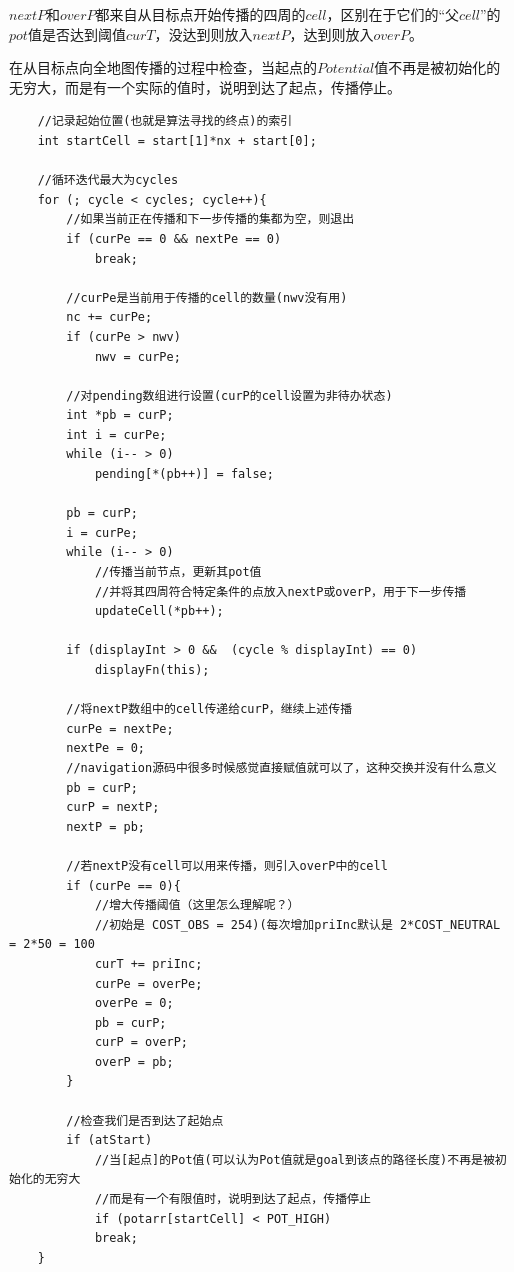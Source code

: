 \documentclass[9pt, oneside]{book}
\begin{document}
$nextP$和$overP$都来自从目标点开始传播的四周的$cell$，区别在于它们的“父$cell$”的$pot$值是否达到阈值$curT$，没达到则放入$nextP$，达到则放入$overP$。

在从目标点向全地图传播的过程中检查，当起点的$Potential$值不再是被初始化的无穷大，而是有一个实际的值时，说明到达了起点，传播停止。

\small
\begin{verbatim}
    //记录起始位置(也就是算法寻找的终点)的索引
    int startCell = start[1]*nx + start[0];

    //循环迭代最大为cycles
    for (; cycle < cycles; cycle++){
        //如果当前正在传播和下一步传播的集都为空，则退出
        if (curPe == 0 && nextPe == 0)
            break;

        //curPe是当前用于传播的cell的数量(nwv没有用)
        nc += curPe;
        if (curPe > nwv)
            nwv = curPe;

        //对pending数组进行设置(curP的cell设置为非待办状态)
        int *pb = curP;
        int i = curPe;			
        while (i-- > 0)
            pending[*(pb++)] = false;

        pb = curP; 
        i = curPe;
        while (i-- > 0)
            //传播当前节点，更新其pot值
            //并将其四周符合特定条件的点放入nextP或overP，用于下一步传播
            updateCell(*pb++);

        if (displayInt > 0 &&  (cycle % displayInt) == 0)
            displayFn(this);

        //将nextP数组中的cell传递给curP，继续上述传播
        curPe = nextPe;
        nextPe = 0;
        //navigation源码中很多时候感觉直接赋值就可以了，这种交换并没有什么意义
        pb = curP;		
        curP = nextP;
        nextP = pb;

        //若nextP没有cell可以用来传播，则引入overP中的cell
        if (curPe == 0){
            //增大传播阈值（这里怎么理解呢？）
            //初始是 COST_OBS = 254)(每次增加priInc默认是 2*COST_NEUTRAL = 2*50 = 100
            curT += priInc;
            curPe = overPe;
            overPe = 0;
            pb = curP;
            curP = overP;
            overP = pb;
        }

        //检查我们是否到达了起始点
        if (atStart)
            //当[起点]的Pot值(可以认为Pot值就是goal到该点的路径长度)不再是被初始化的无穷大
            //而是有一个有限值时，说明到达了起点，传播停止
            if (potarr[startCell] < POT_HIGH)
            break;
    }
\end{verbatim}
\normalsize
\end{document}
